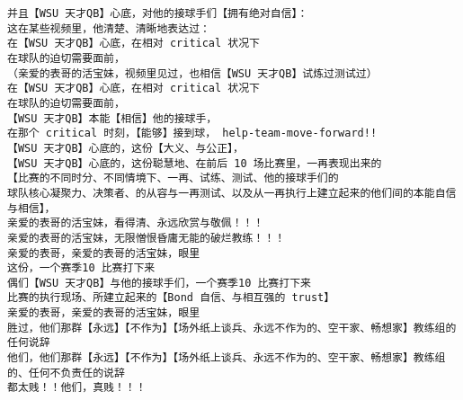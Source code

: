 \documentclass[9pt, b5paper]{article}
\begin{document}
\begin{verbatim}
并且【WSU 天才QB】心底，对他的接球手们【拥有绝对自信】：
这在某些视频里，他清楚、清晰地表达过：
在【WSU 天才QB】心底，在相对 critical 状况下
在球队的迫切需要面前，
（亲爱的表哥的活宝妹，视频里见过，也相信【WSU 天才QB】试炼过测试过）
在【WSU 天才QB】心底，在相对 critical 状况下
在球队的迫切需要面前，
【WSU 天才QB】本能【相信】他的接球手，
在那个 critical 时刻，【能够】接到球， help-team-move-forward!!
【WSU 天才QB】心底的，这份【大义、与公正】，
【WSU 天才QB】心底的，这份聪慧地、在前后 10 场比赛里，一再表现出来的
【比赛的不同时分、不同情境下、一再、试练、测试、他的接球手们的
球队核心凝聚力、决策者、的从容与一再测试、以及从一再执行上建立起来的他们间的本能自信与相信】，
亲爱的表哥的活宝妹，看得清、永远欣赏与敬佩！！！
亲爱的表哥的活宝妹，无限憎恨昏庸无能的破烂教练！！！
亲爱的表哥，亲爱的表哥的活宝妹，眼里
这份，一个赛季10 比赛打下来
偶们【WSU 天才QB】与他的接球手们，一个赛季10 比赛打下来
比赛的执行现场、所建立起来的【Bond 自信、与相互强的 trust】
亲爱的表哥，亲爱的表哥的活宝妹，眼里
胜过，他们那群【永远】【不作为】【场外纸上谈兵、永远不作为的、空干家、畅想家】教练组的任何说辞
他们，他们那群【永远】【不作为】【场外纸上谈兵、永远不作为的、空干家、畅想家】教练组的、任何不负责任的说辞
都太贱！！他们，真贱！！！


\end{verbatim}
\end{document}

